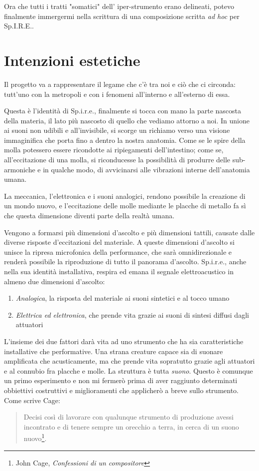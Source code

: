 Ora che tutti i tratti "somatici" dell' iper-strumento erano delineati, potevo finalmente immergermi nella scrittura di una composizione scritta \textit{ad hoc} per Sp.I.R.E..

\section{Intenzioni estetiche}
Il progetto va a rappresentare il legame che c'è tra noi e ciò che ci circonda: tutt'uno con la metropoli e con i fenomeni all'interno e all'esterno di essa.

Questa è l'identità di Sp.i.r.e., finalmente si tocca con mano la parte nascosta della materia, il lato più nascosto di quello che vediamo attorno a noi. In unione ai suoni non udibili e all'invisibile, si scorge un richiamo verso una visione immaginifica che porta fino a dentro la nostra anatomia. Come se le spire della molla potessero essere ricondotte ai ripiegamenti dell'intestino; come se, all'eccitazione di una molla, si riconducesse la possibilità di produrre delle sub-armoniche e in qualche modo, di avvicinarsi alle vibrazioni interne dell'anatomia umana.

La meccanica, l'elettronica e i suoni analogici, rendono possibile la creazione di un mondo nuovo, e l'eccitazione delle molle mediante le placche di metallo fa sì che questa dimensione diventi parte della realtà umana. 

Vengono a formarsi più dimensioni d'ascolto e più dimensioni tattili, causate dalle diverse risposte d'eccitazioni del materiale. A queste dimensioni d'ascolto si unisce la ripresa microfonica della performance, che sarà omnidirezionale e renderà possibile la riproduzione di tutto il panorama d'ascolto. Sp.i.r.e., anche nella sua identità installativa, respira ed emana il segnale elettroacustico in almeno due dimensioni d'ascolto:
\begin{enumerate}
\item{\textit{Analogica}, la risposta del materiale ai suoni sintetici e al tocco umano}
\item{\textit{Elettrica ed elettronica}, che prende vita grazie ai suoni di sintesi diffusi dagli attuatori}
\end{enumerate}

L'insieme dei due fattori darà vita ad uno strumento che ha sia caratteristiche installative che performative. Una strana creature capace sia di suonare amplificata che acusticamente, ma che prende vita sopratutto grazie agli attuatori e al connubio fra placche e molle. La struttura è tutta \textit{suono}. Questo è comunque un primo esperimento e non mi fermerò prima di aver raggiunto determinati obbiettivi costruttivi e miglioramenti che applicherò a breve sullo strumento. Come scrive Cage:
\begin{small}
\begin{quotation}
Decisi così di lavorare con qualunque strumento di produzione avessi incontrato e di tenere sempre un orecchio a terra, in cerca di un suono nuovo\footnote{John Cage, \textit{Confessioni di un compositore}}.
\end{quotation}
\end{small}
